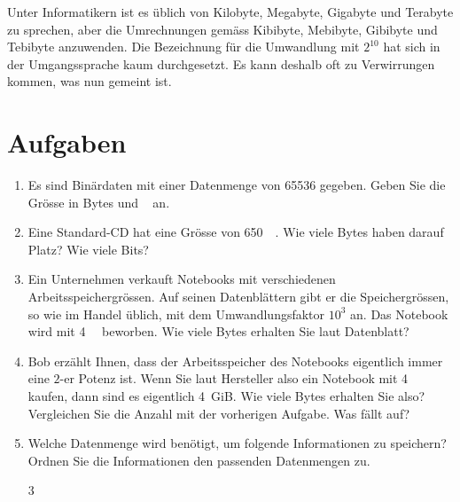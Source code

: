 \begin{important}
Unter Informatikern ist es üblich von Kilobyte, Megabyte, Gigabyte und Terabyte zu sprechen, aber die Umrechnungen gemäss Kibibyte, Mebibyte, Gibibyte und Tebibyte anzuwenden. Die  Bezeichnung für die Umwandlung mit $2^{10}$ hat sich in der Umgangssprache kaum durchgesetzt. Es kann deshalb oft zu Verwirrungen kommen, was nun gemeint ist.
\end{important}

\newpage

\section{Aufgaben}
\begin{enumerate}
\item Es sind Binärdaten mit einer Datenmenge von \qty{65536}{\bit} gegeben. Geben Sie die Grösse in Bytes und \unit{\kibi\byte} an.
\fillwithgrid{1in}
\item Eine Standard-CD hat eine Grösse von  \qty{650}{\mega\byte}. Wie viele Bytes haben darauf Platz? Wie viele Bits?
\fillwithgrid{1in}
\item Ein Unternehmen verkauft Notebooks mit verschiedenen Arbeitsspeichergrössen. Auf seinen Datenblättern gibt er die Speichergrössen, so wie im Handel üblich, mit dem Umwandlungsfaktor $10^3$ an. Das Notebook wird mit  \qty{4}{\giga\byte} beworben. Wie viele Bytes erhalten Sie laut Datenblatt?
\fillwithgrid{1in}
\item Bob erzählt Ihnen, dass der Arbeitsspeicher des Notebooks eigentlich immer eine $2$-er Potenz ist. Wenn Sie laut Hersteller also ein Notebook mit \qty{4}{\giga\byte} kaufen, dann sind es eigentlich \qty{4}{GiB}. Wie viele Bytes erhalten Sie also? Vergleichen Sie die Anzahl mit der vorherigen Aufgabe. Was fällt auf?
\fillwithgrid{1in}
\item Welche Datenmenge wird benötigt, um folgende Informationen zu speichern? Ordnen Sie die Informationen den passenden Datenmengen zu.
\begin{multicols}{3}
\end{multicols}
\end{enumerate}
